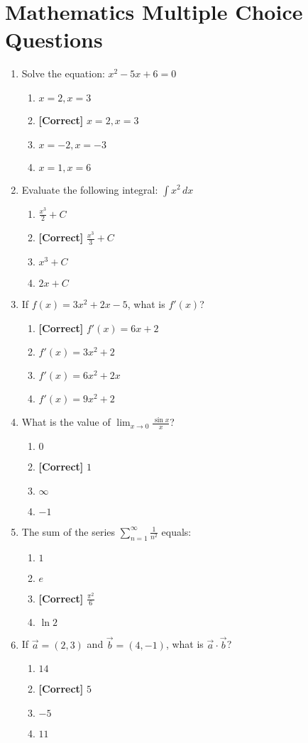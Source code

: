 \documentclass{article}
\newenvironment{problem}{\item}{}
\newcommand{\choice}{\item}
\newcommand{\correctchoice}{\item \textbf{[Correct] }}
\begin{document}
\section{Mathematics Multiple Choice Questions}

\begin{enumerate}
\begin{problem}
Solve the equation: $x^2 - 5x + 6 = 0$
\begin{enumerate}
\choice $x = 2, x = 3$
\correctchoice $x = 2, x = 3$
\choice $x = -2, x = -3$
\choice $x = 1, x = 6$
\end{enumerate}
\end{problem}

\begin{problem}
Evaluate the following integral: $\int x^2 \, dx$
\begin{enumerate}
\choice $\frac{x^3}{2} + C$
\correctchoice $\frac{x^3}{3} + C$
\choice $x^3 + C$
\choice $2x + C$
\end{enumerate}
\end{problem}

\begin{problem}
If $f(x) = 3x^2 + 2x - 5$, what is $f'(x)$?
\begin{enumerate}
\correctchoice $f'(x) = 6x + 2$
\choice $f'(x) = 3x^2 + 2$
\choice $f'(x) = 6x^2 + 2x$
\choice $f'(x) = 9x^2 + 2$
\end{enumerate}
\end{problem}

\begin{problem}
What is the value of $\lim_{x \to 0} \frac{\sin x}{x}$?
\begin{enumerate}
\choice $0$
\correctchoice $1$
\choice $\infty$
\choice $-1$
\end{enumerate}
\end{problem}

\begin{problem}
The sum of the series $\sum_{n=1}^{\infty} \frac{1}{n^2}$ equals:
\begin{enumerate}
\choice $1$
\choice $e$
\correctchoice $\frac{\pi^2}{6}$
\choice $\ln 2$
\end{enumerate}
\end{problem}

\begin{problem}
If $\vec{a} = (2, 3)$ and $\vec{b} = (4, -1)$, what is $\vec{a} \cdot \vec{b}$?
\begin{enumerate}
\choice $14$
\correctchoice $5$
\choice $-5$
\choice $11$
\end{enumerate}
\end{problem}


\end{enumerate}
\end{document}
